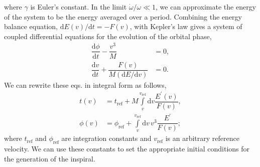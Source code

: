 \documentclass[aps,
prd,
amsmath,
amssymb,
twocolumn,
floatfix,
groupedaddress]{revtex4-1}
\newcommand{\Int}{\displaystyle\int\limits}
\newcommand{\D}{\mathrm{d}}
\newcommand{\refr}{\mathrm{ref}}
\def\l({\left(}
\def\r){\right)}
\begin{document}
where $\gamma$ is Euler's constant. In the limit $\dot{\omega}/\omega \ll 1$, we can approximate the energy of the system to be the energy averaged over a period. Combining the energy balance equation, $\D E(v)/\D t = -F(v)$, with Kepler's law gives a system of coupled differential equations for the evolution of the orbital phase,
\begin{subequations}\label{eq:PNOrbitalEvolution01}
\begin{align}
\dfrac{\D\phi}{\D t} - \dfrac{v^3}{M} &= 0,\label{eq:PNOrbitalEvolution01_01}\\
\dfrac{\D v}{\D t} + \dfrac{F(v)}{M\l(\D E/\D v\r)} &= 0.\label{eq:PNOrbitalEvolution01_02}
\end{align}
\end{subequations}
We can rewrite these eqs. in integral form as follows,
\begin{subequations}\label{eq:PNOrbitalEvolution02}
\begin{align}
t(v) &= t_{\refr} + M\Int_v^{v_{\refr}}\D v\dfrac{E^{\prime}(v)}{F(v)},\label{eq:PNOrbitalEvolution02_01}\\
\phi(v) &= \phi_{\refr} + \Int_v^{v_{\refr}}\D v\,v^3\dfrac{E^{\prime}}{F(v)};\label{eq:PNOrbitalEvolution02_02}
\end{align}
\end{subequations}
where $t_{\refr}$ and $\phi_{\refr}$ are integration constants and $v_{\refr}$ is an arbitrary reference velocity.
We can use these constants to set the appropriate initial conditions for the generation of the inspiral.
%
%
%
\end{document}
